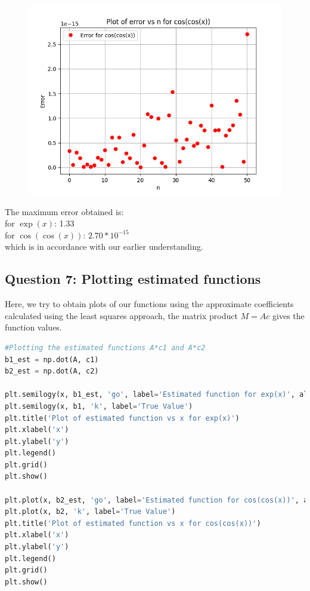 \documentclass[11pt, a4paper]{article}
\begin{document}
\begin{figure}[H]
     \centering
     \includegraphics[scale=0.8]{Figure_12.png}
\end{figure}


The maximum error obtained is:\\
for $\exp(x)$: 1.33\\
for $\cos(\cos(x))$: $2.70 * 10^{-15}$
\\
which is in accordance with our earlier understanding.


\subsection{Question 7: Plotting estimated functions}
Here, we try to obtain plots of our functions using the approximate coefficients calculated using the least squares approach, the matrix product $M = Ac$ gives the function values. \\

\begin{lstlisting}[language = Python]
#Plotting the estimated functions A*c1 and A*c2
b1_est = np.dot(A, c1)
b2_est = np.dot(A, c2)

plt.semilogy(x, b1_est, 'go', label='Estimated function for exp(x)', alpha = 0.5)
plt.semilogy(x, b1, 'k', label='True Value')
plt.title('Plot of estimated function vs x for exp(x)')
plt.xlabel('x')
plt.ylabel('y')
plt.legend()
plt.grid()
plt.show()

plt.plot(x, b2_est, 'go', label='Estimated function for cos(cos(x))', alpha = 0.5)
plt.plot(x, b2, 'k', label='True Value')
plt.title('Plot of estimated function vs x for cos(cos(x))')
plt.xlabel('x')
plt.ylabel('y')
plt.legend()
plt.grid()
plt.show()

\end{lstlisting}
\end{document}

